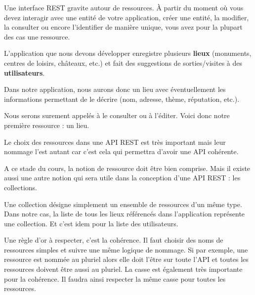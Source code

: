 \documentclass[big]{zmdocument}
\begin{document}


\begin{Quotation}
Une interface REST gravite autour de ressources. À partir du moment où vous devez interagir avec une entité de votre application, créer une entité, la modifier, la consulter ou encore l'identifier de manière unique, vous avez pour la plupart des cas une ressource.
\end{Quotation}



L'application que nous devons développer enregistre plusieurs \textbf{lieux} (monuments, centres de loisirs, châteaux, etc.) et fait des suggestions de sorties/visites à des \textbf{utilisateurs}.



Dans notre application, nous aurons donc un lieu avec éventuellement les informations permettant de le décrire (nom, adresse, thème, réputation, etc.).



Nous serons surement appelés à le consulter ou à l'éditer. Voici donc notre première ressource : un lieu.



Le choix des ressources dans une API REST est très important mais leur nommage l'est autant car c'est cela qui permettra d'avoir une API cohérente.





A ce stade du cours, la notion de ressource doit être bien comprise. Mais il existe aussi une autre notion qui sera utile dans la conception d'une API REST : les collections.



Une collection désigne simplement un ensemble de ressources d'un même type. Dans notre cas, la liste de tous les lieux référencés dans l'application représente une collection. Et c'est idem pour la liste des utilisateurs.





Une règle d'or à respecter, c'est la cohérence. Il faut choisir des noms de ressources simples et suivre une même logique de nommage. 
Si par exemple, une ressource est nommée au pluriel alors elle doit l'être sur toute l'API et toutes les ressources doivent être aussi au pluriel. La casse est également très importante pour la cohérence. Il faudra ainsi respecter la même casse pour toutes les ressources.
\end{document}
